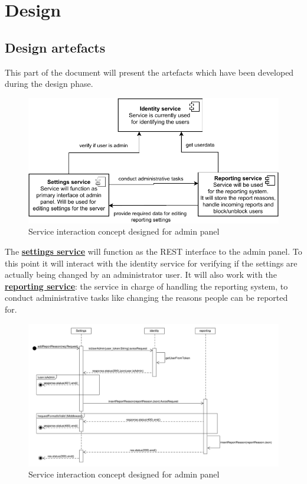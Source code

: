 \chapter{Design}\label{ch:design}

\section{Design artefacts}\label{sec:design-artefacts}

This part of the document will present the artefacts which have been developed during the design phase.

\begin{figure}[h]
    \centering
    \includegraphics[width=1.0\textwidth]{./graphics/component_interaction}
    \caption{Service interaction concept designed for admin panel}
    \label{fig:componentInteraction}
\end{figure}

The \hyperref[subsubsec:settingsSer]{\textbf{settings service}} will function as the REST interface to the admin panel.
To this point it will interact with the identity service for verifying if the settings are actually being changed by an
administrator user.
It will also work with the \hyperref[subsubsec:reportingSer]{\textbf{reporting service}}: the service in charge of
handling the reporting system, to conduct administrative tasks like changing the reasons people can be reported for.

\begin{figure}[H]
    \centering
    \includegraphics[width=1.0\textwidth]{./graphics/SequenceDiagram_AddReportReason}
    \caption{Service interaction concept designed for admin panel}
    \label{fig:sequenceDiagramAddReportReason}
\end{figure}

